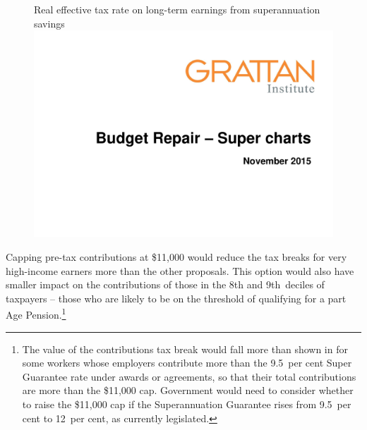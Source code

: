 \begin{figure}
%
{Real effective tax rate on long-term earnings from superannuation savings}\label{fig:SUPER-4-9}
\includegraphics[width=\columnwidth,page=27]{super-atlas/PPTX.pdf}
\end{figure}

Capping pre-tax contributions at \$11,000 would reduce the tax breaks for very high-income earners more than the other proposals. This option would also have smaller impact on the contributions of those in the 8th and 9th~deciles of taxpayers – those who are likely to be on the threshold of qualifying for a part Age Pension.\footnote{The value of the contributions tax break would fall more than shown in  for some workers whose employers contribute more than the 9.5~per cent Super Guarantee rate under awards or agreements, so that their total contributions are more than the \$11,000 cap. Government would need to consider whether to raise the \$11,000 cap if the Superannuation Guarantee rises from 9.5~per cent to 12~per cent, as currently legislated.} 

